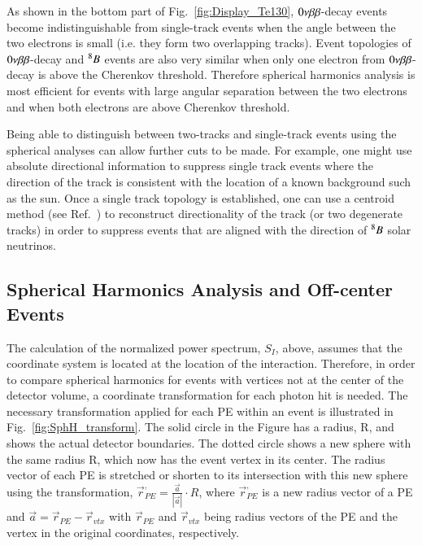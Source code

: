 
As shown in the bottom part of Fig.~\ref{fig:Display_Te130}, $0\nu\beta\beta$-decay events become indistinguishable from single-track events when the angle between the two electrons is small (i.e. they form two overlapping tracks). Event topologies of $0\nu\beta\beta$-decay and $^{8}B$ events are also very similar when only one electron from $0\nu\beta\beta$-decay is above the Cherenkov threshold. Therefore spherical harmonics analysis is most efficient for events with large angular separation between the two electrons and when both electrons are above Cherenkov threshold. 

Being able to distinguish between two-tracks and single-track events using the spherical analyses can allow further cuts to be made.  For example, one might use absolute directional information to suppress single track events where the direction of the track is consistent with the location of a known background such as the sun. Once a single track topology is established, one can use a centroid method (see Ref.~\cite{Directionality}) to reconstruct directionality of the track (or two degenerate tracks) in order to suppress events that are aligned with the direction of $^{8}B$ solar neutrinos.

\subsection{Spherical Harmonics Analysis and Off-center Events}

The calculation of the normalized power spectrum, $S_I$, above, assumes that the coordinate system is located at the location of the interaction.  Therefore, in order to compare spherical harmonics for events with vertices not at the center of the detector volume, a coordinate transformation for each photon hit is needed. The necessary transformation applied for each PE within an event is illustrated in Fig.~\ref{fig:SphH_transform}. The solid circle in the Figure has a radius, R, and shows the actual detector boundaries. The dotted circle shows a new sphere with the same radius R, which now has the event vertex in its center. The radius vector of each PE is stretched or shorten to its intersection with this new sphere using the transformation, $\vec{r}^{,}_{PE} = \frac{\vec{a}}{|\vec{a}|} \cdot R$, where $\vec{r}^{,}_{PE}$ is a new radius vector of a PE and $\vec{a}=\vec{r}_{PE} - \vec{r}_{vtx}$ with $\vec{r}_{PE}$ and $\vec{r}_{vtx}$ being radius vectors of the PE and the vertex in the original coordinates, respectively.

